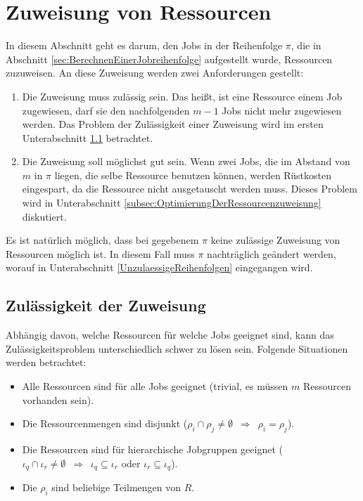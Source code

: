 \documentclass{scrreprt}
\begin{document}
\section{Zuweisung von Ressourcen}
\label{sec:ZuweisungVonRessourcen}
In diesem Abschnitt geht es darum, den Jobs in der Reihenfolge $\pi$, die in Abschnitt \ref{sec:BerechnenEinerJobreihenfolge} aufgestellt wurde,
Ressourcen zuzuweisen. An diese Zuweisung werden zwei Anforderungen gestellt:
\begin{enumerate}
    \item Die Zuweisung muss zulässig sein. Das heißt, ist eine Ressource einem Job zugewiesen, darf sie den nachfolgenden $m-1$ Jobs nicht mehr zugewiesen werden.
        Das Problem der Zulässigkeit einer Zuweisung wird im ersten Unterabschnitt \ref{subsec:ZulaessigkeitDerZuweisung} betrachtet.
    \item Die Zuweisung soll möglichst gut sein. Wenn zwei Jobs, die im Abstand von $m$ in $\pi$ liegen, die selbe Ressource benutzen können,
        werden Rüstkosten eingespart, da die Ressource nicht ausgetauscht werden muss.
        Dieses Problem wird in Unterabschnitt \ref{subsec:OptimierungDerRessourcenzuweisung} diskutiert.
\end{enumerate}
Es ist natürlich möglich, dass bei gegebenem $\pi$ keine zulässige Zuweisung von Ressourcen möglich ist.
In diesem Fall muss $\pi$ nachträglich geändert werden, worauf in Unterabschnitt \ref{UnzulaessigeReihenfolgen} eingegangen wird.

\subsection{Zulässigkeit der Zuweisung}
\label{subsec:ZulaessigkeitDerZuweisung}
Abhängig davon, welche Ressourcen für welche Jobs geeignet sind, kann das Zulässigkeitsproblem unterschiedlich schwer zu lösen sein.
Folgende Situationen werden betrachtet:
\begin{itemize}
    \item Alle Ressourcen sind für alle Jobs geeignet (trivial, es müssen $m$ Ressourcen vorhanden sein).
    \item Die Ressourcenmengen sind disjunkt ($\rho_i\cap\rho_j \neq \emptyset \enspace \Rightarrow \enspace \rho_i = \rho_j$).
    \item Die Ressourcen sind für hierarchische Jobgruppen geeignet 
        ($\iota_q\cap\iota_r \neq \emptyset \enspace \Rightarrow \enspace \iota_q\subseteq\iota_r$ oder $\iota_r\subseteq\iota_q$).
    \item Die $\rho_i$ sind beliebige Teilmengen von $R$.
\end{itemize}
\end{document}
